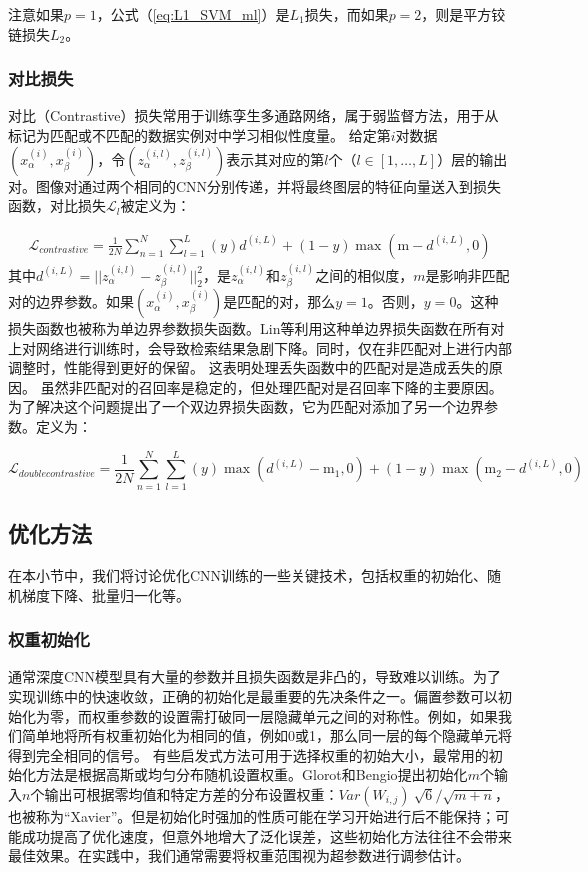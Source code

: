 注意如果$ p = 1 $，公式（\ref{eq:L1_SVM_ml}）是$ L_1 $损失，而如果$ p = 2 $，则是平方铰链损失$ L_2$。

\subsubsection{对比损失}
对比（Contrastive）损失\cite{Shaham2017Learning}常用于训练孪生多通路网络，属于弱监督方法，用于从标记为匹配或不匹配的数据实例对中学习相似性度量。 给定第$i$对数据$(x_{\alpha} ^{(i)},x_{\beta} ^{(i)})$，令$(z_{\alpha} ^{(i,l)},z_{\beta} ^{(i,l)})$表示其对应的第$l$个（$l \in [1,\dots,L]$）层的输出对。图像对通过两个相同的CNN分别传递，并将最终图层的特征向量送入到损失函数，对比损失$ \mathcal {L} _l $被定义为：

\begin{equation}
\begin{aligned}
\label{ContrastiveLoss}
 \mathcal{L}_{contrastive}= \frac{1}{2N}\sum_{n=1}^{N}\sum_{l=1}^{L}(y)d^{(i,L)} + (1-y)\max(\mathrm{m}-d^{(i,L)}, 0) 
\end{aligned}
\end{equation}
其中$d^{(i,L)} = ||z_{\alpha}^{(i,l)} - z_{\beta}^{(i,l)}||_2^2$，是$ z ^{(i,l)}_\alpha $和$ z^{(i,l)}_\beta $之间的相似度，$ m $是影响非匹配对的边界参数。如果$(x_{\alpha} ^{(i)},x_{\beta} ^{(i)})$是匹配的对，那么$ y = 1 $。否则，$ y = 0 $。这种损失函数也被称为单边界参数损失函数。Lin等\cite{Zhu2016b}利用这种单边界损失函数在所有对上对网络进行训练时，会导致检索结果急剧下降。同时，仅在非匹配对上进行内部调整时，性能得到更好的保留。 这表明处理丢失函数中的匹配对是造成丢失的原因。 虽然非匹配对的召回率是稳定的，但处理匹配对是召回率下降的主要原因。 为了解决这个问题提出了一个双边界损失函数，它为匹配对添加了另一个边界参数。定义为：

\begin{equation}
\label{DMContrastiveLoss}
\mathcal{L}_{doublecontrastive}= \frac{1}{2N}\sum_{n=1}^{N}\sum_{l=1}^{L}(y)\max(d^{(i,L)}-\mathrm{m}_1,0) + (1-y)\max(\mathrm{m}_2-d^{(i,L)}, 0)
\end{equation}
\subsection{优化方法}
在本小节中，我们将讨论优化CNN训练的一些关键技术，包括权重的初始化、随机梯度下降、批量归一化等。

\subsubsection{权重初始化}
通常深度CNN模型具有大量的参数并且损失函数是非凸的，导致难以训练。为了实现训练中的快速收敛，正确的初始化是最重要的先决条件之一。偏置参数可以初始化为零，而权重参数的设置需打破同一层隐藏单元之间的对称性。例如，如果我们简单地将所有权重初始化为相同的值，例如0或1，那么同一层的每个隐藏单元将得到完全相同的信号。
有些启发式方法可用于选择权重的初始大小，最常用的初始化方法是根据高斯或均匀分布随机设置权重。Glorot和Bengio\cite{Glorot2010}提出初始化$m$个输入$n$个输出可根据零均值和特定方差的分布设置权重：$ Var(W_{i,j})~ \sqrt{6} / \sqrt{m + n} $，也被称为“Xavier”。但是初始化时强加的性质可能在学习开始进行后不能保持；可能成功提高了优化速度，但意外地增大了泛化误差，这些初始化方法往往不会带来最佳效果。在实践中，我们通常需要将权重范围视为超参数进行调参估计。

